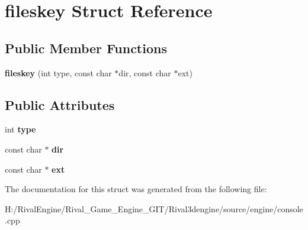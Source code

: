 \hypertarget{structfileskey}{}\section{fileskey Struct Reference}
\label{structfileskey}
\subsection*{Public Member Functions}
\begin{DoxyCompactItemize}
\item 
\mbox{\label{structfileskey_a7c397022d00a7bd1402e8398f88ea31a}} 
{\bfseries fileskey} (int type, const char $\ast$dir, const char $\ast$ext)
\end{DoxyCompactItemize}
\subsection*{Public Attributes}
\begin{DoxyCompactItemize}
\item 
\mbox{\label{structfileskey_a238a30fb793973e0e8d5ba4e7a860f5b}} 
int {\bfseries type}
\item 
\mbox{\label{structfileskey_ab05a6fdd16c979a90faa229fe603b771}} 
const char $\ast$ {\bfseries dir}
\item 
\mbox{\label{structfileskey_ab2e3d6cf43c8511de829e88bb65e7a1d}} 
const char $\ast$ {\bfseries ext}
\end{DoxyCompactItemize}


The documentation for this struct was generated from the following file\+:\begin{DoxyCompactItemize}
\item 
H\+:/\+Rival\+Engine/\+Rival\+\_\+\+Game\+\_\+\+Engine\+\_\+\+G\+I\+T/\+Rival3dengine/source/engine/console.\+cpp\end{DoxyCompactItemize}
